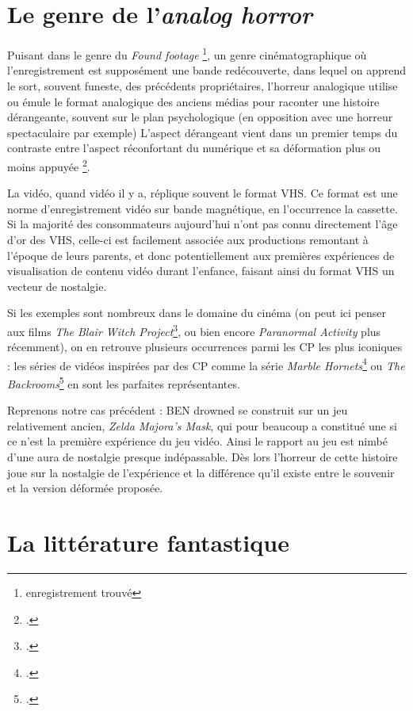 \documentclass[12pt,a4paper,oneside,titlepage]{book} %
\begin{document}
\section{Le genre de l'\emph{analog horror}}

Puisant dans le genre du \textit{Found footage} \footnote{enregistrement trouvé}, un genre cinématographique où l'enregistrement est supposément une bande redécouverte, dans lequel on apprend le sort, souvent funeste, des précédents propriétaires,  l'horreur analogique utilise ou émule le format analogique des anciens médias pour raconter une histoire dérangeante, souvent sur le plan psychologique (en opposition avec une horreur spectaculaire par exemple) 
L'aspect dérangeant vient dans un premier temps du contraste entre l'aspect réconfortant du numérique et sa déformation plus ou moins appuyée \footcite{balanzategui_creepypasta_2019}.

La vidéo, quand vidéo il y a, réplique souvent le format VHS. Ce format est une norme d'enregistrement vidéo sur bande magnétique, en l'occurrence la cassette. Si la majorité des consommateurs aujourd'hui n'ont pas connu directement l'âge d'or des VHS, celle-ci est facilement associée aux productions remontant à l'époque de leurs parents, et donc potentiellement aux premières expériences de visualisation de contenu vidéo durant l'enfance, faisant ainsi du format VHS un vecteur de nostalgie.

Si les exemples sont nombreux dans le domaine du cinéma (on peut ici penser aux films \emph{The Blair Witch Project}\footcite{myrick_blair_1999}, ou bien encore \emph{Paranormal Activity} plus récemment), on en retrouve plusieurs occurrences parmi les CP les plus iconiques : les séries de vidéos inspirées par des CP comme la série \emph{Marble Hornets}\footcite{marble_hornets_introduction_2009} ou \emph{The Backrooms}\footcite{kane_pixels_backrooms_2022} en sont les parfaites représentantes.

Reprenons notre cas précédent : BEN drowned se construit sur un jeu relativement ancien, \textit{Zelda Majora's Mask}, qui pour beaucoup a constitué une si ce n'est la première expérience du jeu vidéo. Ainsi le rapport au jeu est nimbé d'une aura de nostalgie presque indépassable. Dès lors l'horreur de cette histoire joue sur la nostalgie de l'expérience et la différence qu'il existe entre le souvenir et la version déformée proposée. 

\section{La littérature fantastique}
\label{litt-fant}
\end{document}
